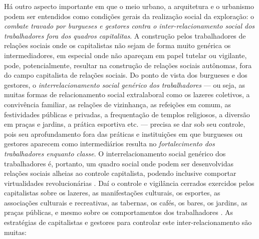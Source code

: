 Há outro aspecto importante em que o meio urbano, a arquitetura e o urbanismo podem ser entendidos como condições gerais da realização social da exploração: o \textit{combate travado por burgueses e gestores contra o inter-relacionamento social dos trabalhadores fora dos quadros capitalitas}. A construção pelos trabalhadores de relações sociais onde os capitalistas não sejam de forma muito genérica os intermediadores, em especial onde não apareçam em papel tutelar ou vigilante, pode, potencialmente, resultar na construção de relações sociais autônomas, fora do campo capitalista de relações sociais. Do ponto de vista dos burgueses e dos gestores, o \textit{interrelacionamento social genérico dos trabalhadores} --- ou seja, as muitas formas de relacionamento social extralaboral como os lazeres coletivos, a convivência familiar, as relações de vizinhança, as refeições em comum, as festividades públicas e privadas, a frequentação de templos religiosos, a diversão em praças e jardins, a prática esportiva etc. --- precisa se dar sob seu controle, pois seu aprofundamento fora das práticas e instituições em que burgueses ou gestores aparecem como intermediários resulta no \textit{fortalecimento dos trabalhadores enquanto classe}. O interrelacionamento social genérico dos trabalhadores é, portanto, um quadro social onde podem ser desenvolvidas relações sociais alheias ao controle capitalista, podendo inclusive comportar virtualidades revolucionárias \cite[p.~329]{BERNARDO1991}. Daí o controle e vigilância cerrados exercidos pelos capitalistas sobre os lazeres, as manifestações culturais, os esportes, as associações culturais e recreativas, as tabernas, os cafés, os bares, os jardins, as praças públicas, e mesmo sobre os comportamentos dos trabalhadores \cite[p.~317]{BERNARDO1991}. As estratégias de capitalistas e gestores para controlar este inter-relacionamento são muitas:

